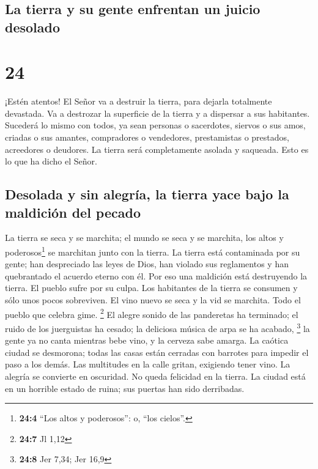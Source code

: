 \hypertarget{la-tierra-y-su-gente-enfrentan-un-juicio-desolado}{%
\subsection{La tierra y su gente enfrentan un juicio
desolado}\label{la-tierra-y-su-gente-enfrentan-un-juicio-desolado}}

\hypertarget{section-23}{%
\section{24}\label{section-23}}

 ¡Estén atentos! El Señor va a destruir la tierra, para
dejarla totalmente devastada. Va a destrozar la superficie de la tierra
y a dispersar a sus habitantes.  Sucederá lo mismo con
todos, ya sean personas o sacerdotes, siervos o sus amos, criadas o sus
amantes, compradores o vendedores, prestamistas o prestados, acreedores
o deudores.  La tierra será completamente asolada y
saqueada. Esto es lo que ha dicho el Señor.

\hypertarget{desolada-y-sin-alegruxeda-la-tierra-yace-bajo-la-maldiciuxf3n-del-pecado}{%
\subsection{Desolada y sin alegría, la tierra yace bajo la maldición del
pecado}\label{desolada-y-sin-alegruxeda-la-tierra-yace-bajo-la-maldiciuxf3n-del-pecado}}

 La tierra se seca y se marchita; el mundo se seca y se
marchita, los altos y poderosos\footnote{\textbf{24:4} ``Los altos y
  poderosos'': o, ``los cielos''.} se marchitan junto con la tierra.
 La tierra está contaminada por su gente; han despreciado
las leyes de Dios, han violado sus reglamentos y han quebrantado el
acuerdo eterno con él.  Por eso una maldición está
destruyendo la tierra. El pueblo sufre por su culpa. Los habitantes de
la tierra se consumen y sólo unos pocos sobreviven.  El
vino nuevo se seca y la vid se marchita. Todo el pueblo que celebra
gime. \footnote{\textbf{24:7} Jl 1,12}  El alegre sonido
de las panderetas ha terminado; el ruido de los juerguistas ha cesado;
la deliciosa música de arpa se ha acabado, \footnote{\textbf{24:8} Jer
  7,34; Jer 16,9}  la gente ya no canta mientras bebe
vino, y la cerveza sabe amarga.  La caótica ciudad se
desmorona; todas las casas están cerradas con barrotes para impedir el
paso a los demás.  Las multitudes en la calle gritan,
exigiendo tener vino. La alegría se convierte en oscuridad. No queda
felicidad en la tierra.  La ciudad está en un horrible
estado de ruina; sus puertas han sido derribadas.


